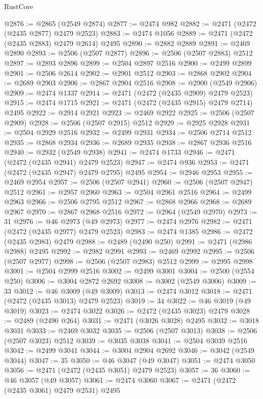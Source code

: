 \begin{lexlean}{RustCore}
\begin{coremodule}
@2876 := @2865 (@2549 @2874)
@2877 := @2474 @982
@2882 := @2471 (@2472 (@2435 @2877) @2479 @2523)
@2883 := @2474 @1056
@2889 := @2471 (@2472 (@2435 @2883) @2479 @2614) @2495
@2890 := @2882 @2889
@2891 := @2469 @2890
@2893 := @2506 (@2507 @2877)
@2896 := @2506 (@2507 @2883) @2512
@2897 := @2893 @2896
@2899 := @2504 @2897 @2516
@2900 := @2499 @2899
@2901 := @2506 @2614
@2902 := @2901 @2512
@2903 := @2868 @2902
@2904 := @2689 @2903
@2906 := @2867 @2904 @2516
@2908 := @2900 (@2549 @2906)
@2909 := @2474 @1337
@2914 := @2471 (@2472 (@2435 @2909) @2479 @2523)
@2915 := @2474 @1715
@2921 := @2471 (@2472 (@2435 @2915) @2479 @2714) @2495
@2922 := @2914 @2921
@2923 := @2469 @2922
@2925 := @2506 (@2507 @2909)
@2928 := @2506 (@2507 @2915) @2512
@2929 := @2925 @2928
@2931 := @2504 @2929 @2516
@2932 := @2499 @2931
@2934 := @2506 @2714 @2512
@2935 := @2868 @2934
@2936 := @2689 @2935
@2938 := @2867 @2936 @2516
@2940 := @2932 (@2549 @2938)
@2941 := @2474 @1733
@2946 := @2471 (@2472 (@2435 @2941) @2479 @2523)
@2947 := @2474 @936
@2953 := @2471 (@2472 (@2435 @2947) @2479 @2795) @2495
@2954 := @2946 @2953
@2955 := @2469 @2954
@2957 := @2506 (@2507 @2941)
@2960 := @2506 (@2507 @2947) @2512
@2961 := @2957 @2960
@2963 := @2504 @2961 @2516
@2964 := @2499 @2963
@2966 := @2506 @2795 @2512
@2967 := @2868 @2966
@2968 := @2689 @2967
@2970 := @2867 @2968 @2516
@2972 := @2964 (@2549 @2970)
@2973 := 31
@2976 := @46 @2973 (@49 @2973)
@2977 := @2474 @2976
@2982 := @2471 (@2472 (@2435 @2977) @2479 @2523)
@2983 := @2474 @1385
@2986 := @2472 (@2435 @2983) @2479
@2988 := @2489 (@2490 @250)
@2991 := @2471 (@2986 @2988) @2495
@2992 := @2982 @2991
@2993 := @2469 @2992
@2995 := @2506 (@2507 @2977)
@2998 := @2506 (@2507 @2983) @2512
@2999 := @2995 @2998
@3001 := @2504 @2999 @2516
@3002 := @2499 @3001
@3004 := @2500 (@2554 @250)
@3006 := @3004 @2872 @2692
@3008 := @3002 (@2549 @3006)
@3009 := 33
@3012 := @46 @3009 (@49 @3009)
@3013 := @2474 @3012
@3018 := @2471 (@2472 (@2435 @3013) @2479 @2523)
@3019 := 34
@3022 := @46 @3019 (@49 @3019)
@3023 := @2474 @3022
@3026 := @2472 (@2435 @3023) @2479
@3028 := @2489 (@2490 @264)
@3031 := @2471 (@3026 @3028) @2495
@3032 := @3018 @3031
@3033 := @2469 @3032
@3035 := @2506 (@2507 @3013)
@3038 := @2506 (@2507 @3023) @2512
@3039 := @3035 @3038
@3041 := @2504 @3039 @2516
@3042 := @2499 @3041
@3044 := @3004 @2904 @2692
@3046 := @3042 (@2549 @3044)
@3047 := 35
@3050 := @46 @3047 (@49 @3047)
@3051 := @2474 @3050
@3056 := @2471 (@2472 (@2435 @3051) @2479 @2523)
@3057 := 36
@3060 := @46 @3057 (@49 @3057)
@3061 := @2474 @3060
@3067 := @2471 (@2472 (@2435 @3061) @2479 @2531) @2495

\end{coremodule}
\end{lexlean}

